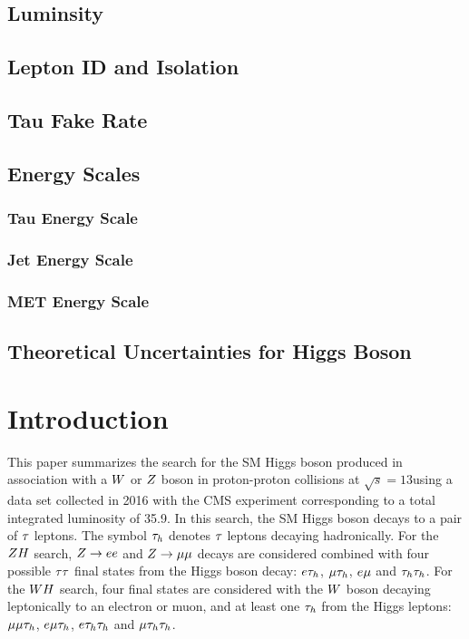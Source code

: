 \subsection{Luminsity}
\subsection{Lepton ID and Isolation}
\subsection{Tau Fake Rate}
\subsection{Energy Scales}
\subsubsection{Tau Energy Scale}
\subsubsection{Jet Energy Scale}
\subsubsection{MET Energy Scale}
\subsection{Theoretical Uncertainties for Higgs Boson}


\section{Introduction\label{sec:intro}}

This paper summarizes the search for the SM Higgs boson 
produced in association with a $W$ or $Z$ boson in proton-proton
collisions at $\sqrt{s}=13$\TeV using a data set collected 
in 2016 with the CMS experiment corresponding to a total integrated luminosity of 35.9\fbinv.
In this search, the SM Higgs boson decays to a pair of $\tau$ leptons. The symbol $\tau_{h}$ denotes $\tau$ leptons decaying hadronically.
For the $ZH$ search, $Z\rightarrow ee$
and $Z \to \mu\mu$ decays are considered combined with four possible $\tau\tau$ 
final states from the Higgs boson decay: $e\tau_{h}$, $\mu\tau_{h}$,
$e\mu$ and $\tau_{h}\tau_{h}$. For the $WH$ search, four final states are considered with
the $W$ boson decaying leptonically to an electron or muon, and at least one $\tau_{h}$ from the Higgs leptons:
$\mu\mu\tau_{h}$, $e\mu\tau_{h}$, $e\tau_{h}\tau_{h}$ and $\mu\tau_{h}\tau_{h}$. 



